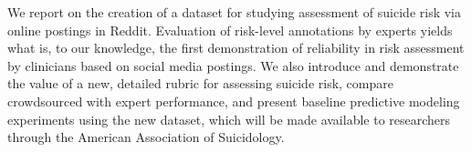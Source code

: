 We report on the creation of a dataset for studying assessment of suicide risk via online postings in Reddit. Evaluation of risk-level annotations by experts yields what is, to our knowledge, the first demonstration of reliability in risk assessment by clinicians based on social media postings. We also introduce and demonstrate the value of a new, detailed rubric for assessing suicide risk, compare crowdsourced with expert performance, and present baseline predictive modeling experiments using the new dataset, which will be made available to researchers through the American Association of Suicidology.
